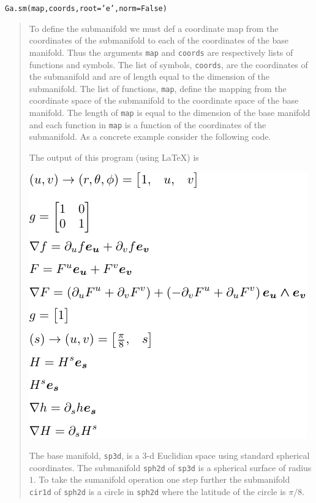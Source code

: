 \documentclass[12pt]{report}
\newcommand{\T}[1]{\texttt{#1}}
\newcommand{\includecode}[1]{}
\begin{document}
\T{Ga.sm(map,coords,root='e',norm=False)}
\begin{quote}
	To define the submanifold we must def a coordinate map from the coordinates of the submanifold to
	each of the coordinates of the base manifold.  Thus the arguments \T{map} and \T{coords} are 
	respectively lists of functions and symbols.  The list of symbols, \T{coords}, are the coordinates of the 
	submanifold and are of length equal to the dimension of the submanifold.  The list of functions, \T{map},
	define the mapping from the coordinate space of the submanifold to the coordinate space of the 
	base manifold.  The length of \T{map} is equal to the dimension of the base manifold and each function in
	\T{map} is a function of the coordinates of the submanifold. As a concrete example consider the
	following code.
	\includecode{python/submanifold.py}
	The output of this program (using \LaTeX) is
	\begin{center}
	\includegraphics[scale=0.9]{python/submanifold.pdf}	
	\end{center} 	

	The base manifold, \T{sp3d}, is a 3-d Euclidian space using standard spherical coordinates. The submanifold
	\T{sph2d} of \T{sp3d} is a spherical surface of radius $1$.  To take the sumanifold operation one step further
	the submanifold \T{cir1d} of \T{sph2d} is a circle in \T{sph2d} where the latitude of the circle is $\pi/8$.
	

\end{quote}
\end{document}

